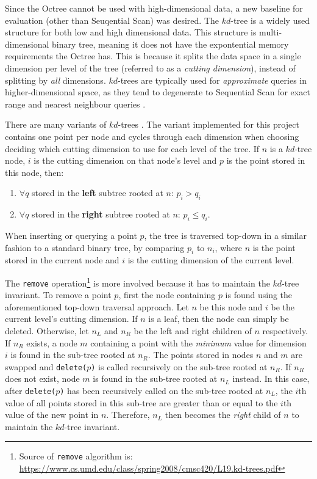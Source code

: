 Since the Octree cannot be used with high-dimensional data, a new baseline for evaluation (other than Seuqential Scan) was desired. The $kd$-tree is a widely used structure for both low and high dimensional data. This structure is multi-dimensional binary tree, meaning it does not have the expontential memory requirements the Octree has. This is because it splits the data space in a single dimension per level of the tree (referred to as a \textit{cutting dimension}), instead of splitting by \textit{all} dimensions. $kd$-trees are typically used for \textit{approximate} queries in higher-dimensional space, as they tend to degenerate to Sequential Scan for exact range and nearest neighbour queries \cite{similarity-searching}.

There are many variants of $kd$-trees \cite{kd-tree, bkd-tree, kdb-tree}. The variant implemented for this project contains one point per node and cycles through each dimension when choosing deciding which cutting dimension to use for each level of the tree. If $n$ is a $kd$-tree node, $i$ is the cutting dimension on that node's level and $p$ is the point stored in this node, then:
\begin{enumerate}
	\item $\forall q$ stored in the \textbf{left} subtree rooted at $n$: $p_i > q_i$ 
	\item $\forall q$ stored in the \textbf{right} subtree rooted at $n$: $p_i \leq q_i$.
\end{enumerate}
When inserting or querying a point $p$, the tree is traversed top-down in a similar fashion to a standard binary tree, by comparing $p_i$ to $n_i$, where $n$ is the point stored in the current node and $i$ is the cutting dimension of the current level.

The \texttt{remove} operation\footnote{Source of \texttt{remove} algorithm is: \url{https://www.cs.umd.edu/class/spring2008/cmsc420/L19.kd-trees.pdf‎}} is more involved because it has to maintain the $kd$-tree invariant. To remove a point $p$, first the node containing $p$ is found using the aforementioned top-down traversal approach. Let $n$ be this node and $i$ be the current level's cutting dimension. If $n$ is a leaf, then the node can simply be deleted. Otherwise, let $n_L$ and $n_R$ be the left and right children of $n$ respectively. If $n_R$ exists, a node $m$ containing a point with the \textit{minimum} value for dimension $i$ is found in the sub-tree rooted at $n_R$. The points stored in nodes $n$ and $m$ are swapped and \texttt{delete($p$)} is called recursively on the sub-tree rooted at $n_R$. If $n_R$ does not exist, node $m$ is found in the sub-tree rooted at $n_L$ instead. In this case, after \texttt{delete($p$)} has been recursively called on the sub-tree rooted at $n_L$, the $i$th value of all points stored in this sub-tree are greater than or equal to the $i$th value of the new point in $n$. Therefore, $n_L$ then becomes the \textit{right} child of $n$ to maintain the $kd$-tree invariant.

